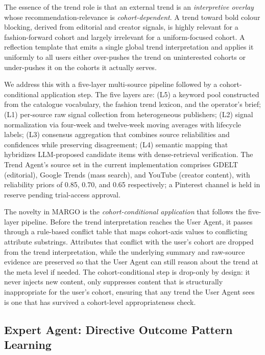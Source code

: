 \documentclass[master,english,final]{postech-ucs}
\begin{document}
The essence of the trend role is that an external trend is an \emph{interpretive overlay} whose recommendation-relevance is \emph{cohort-dependent}.
A trend toward bold colour blocking, derived from editorial and creator signals, is highly relevant for a fashion-forward cohort and largely irrelevant for a uniform-focused cohort.
A reflection template that emits a single global trend interpretation and applies it uniformly to all users either over-pushes the trend on uninterested cohorts or under-pushes it on the cohorts it actually serves.

We address this with a five-layer multi-source pipeline followed by a cohort-conditional application step.
The five layers are: (L5) a keyword pool constructed from the catalogue vocabulary, the fashion trend lexicon, and the operator's brief; (L1) per-source raw signal collection from heterogeneous publishers; (L2) signal normalization via four-week and twelve-week moving averages with lifecycle labels; (L3) consensus aggregation that combines source reliabilities and confidences while preserving disagreement; (L4) semantic mapping that hybridizes LLM-proposed candidate items with dense-retrieval verification.
The Trend Agent's source set in the current implementation comprises GDELT (editorial), Google Trends (mass search), and YouTube (creator content), with reliability priors of 0.85, 0.70, and 0.65 respectively; a Pinterest channel is held in reserve pending trial-access approval.

The novelty in MARGO is the \emph{cohort-conditional application} that follows the five-layer pipeline.
Before the trend interpretation reaches the User Agent, it passes through a rule-based conflict table that maps cohort-axis values to conflicting attribute substrings.
Attributes that conflict with the user's cohort are dropped from the trend interpretation, while the underlying summary and raw-source evidence are preserved so that the User Agent can still reason about the trend at the meta level if needed.
The cohort-conditional step is drop-only by design: it never injects new content, only suppresses content that is structurally inappropriate for the user's cohort, ensuring that any trend the User Agent sees is one that has survived a cohort-level appropriateness check.


\subsection{Expert Agent: Directive Outcome Pattern Learning}
\end{document}
